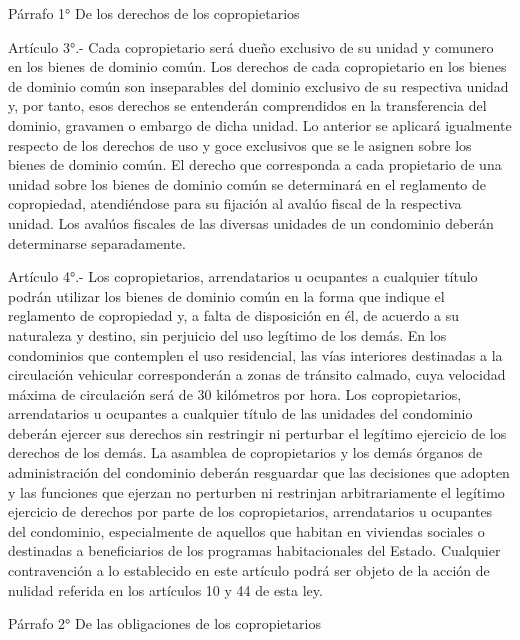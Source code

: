     Párrafo 1°
    De los derechos de los copropietarios

     
    Artículo 3°.- Cada copropietario será dueño exclusivo de su unidad y comunero en los bienes de dominio común.
    Los derechos de cada copropietario en los bienes de dominio común son inseparables del dominio exclusivo de su respectiva unidad y, por tanto, esos derechos se entenderán comprendidos en la transferencia del dominio, gravamen o embargo de dicha unidad. Lo anterior se aplicará igualmente respecto de los derechos de uso y goce exclusivos que se le asignen sobre los bienes de dominio común.
    El derecho que corresponda a cada propietario de una unidad sobre los bienes de dominio común se determinará en el reglamento de copropiedad, atendiéndose para su fijación al avalúo fiscal de la respectiva unidad.
    Los avalúos fiscales de las diversas unidades de un condominio deberán determinarse separadamente.
     
    Artículo 4°.- Los copropietarios, arrendatarios u ocupantes a cualquier título podrán utilizar los bienes de dominio común en la forma que indique el reglamento de copropiedad y, a falta de disposición en él, de acuerdo a su naturaleza y destino, sin perjuicio del uso legítimo de los demás.
    En los condominios que contemplen el uso residencial, las vías interiores destinadas a la circulación vehicular corresponderán a zonas de tránsito calmado, cuya velocidad máxima de circulación será de 30 kilómetros por hora.
    Los copropietarios, arrendatarios u ocupantes a cualquier título de las unidades del condominio deberán ejercer sus derechos sin restringir ni perturbar el legítimo ejercicio de los derechos de los demás.
    La asamblea de copropietarios y los demás órganos de administración del condominio deberán resguardar que las decisiones que adopten y las funciones que ejerzan no perturben ni restrinjan arbitrariamente el legítimo ejercicio de derechos por parte de los copropietarios, arrendatarios u ocupantes del condominio, especialmente de aquellos que habitan en viviendas sociales o destinadas a beneficiarios de los programas habitacionales del Estado. Cualquier contravención a lo establecido en este artículo podrá ser objeto de la acción de nulidad referida en los artículos 10 y 44 de esta ley.
     
    Párrafo 2°
    De las obligaciones de los copropietarios

